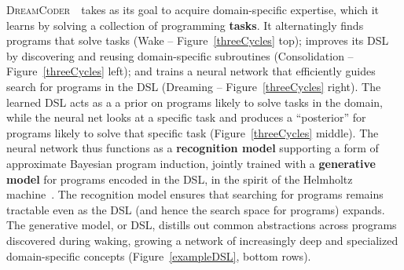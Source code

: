 \documentclass{article}
\newcommand{\system}{\textsc{DreamCoder}~}
\begin{document}
\system~takes as its goal to acquire domain-specific expertise, which
it learns by solving a collection of programming \textbf{tasks}.  It
alternatingly finds programs that solve tasks (Wake --
Figure~\ref{threeCycles} top); improves its DSL by discovering and
reusing domain-specific subroutines (Consolidation --
Figure~\ref{threeCycles} left); and trains a neural network that
efficiently guides search for programs in the DSL (Dreaming --
Figure~\ref{threeCycles} right).  The learned DSL acts as a a prior on
programs likely to solve tasks in the domain, while the neural net
looks at a specific task and produces a ``posterior'' for programs
likely to solve that specific task (Figure~\ref{threeCycles} middle).
The neural network thus functions as a \textbf{recognition model}
supporting a form of approximate Bayesian program induction, jointly
trained with a \textbf{generative model} for programs encoded in the
DSL, in the spirit of the Helmholtz machine~\cite{hinton1995wake}. The
recognition model ensures that searching for programs remains
tractable even as the DSL (and hence the search space for programs)
expands.  The generative model, or DSL, distills out common
abstractions across programs discovered during waking, growing a
network of increasingly deep and specialized domain-specific concepts
(Figure~\ref{exampleDSL}, bottom rows).
\end{document}
